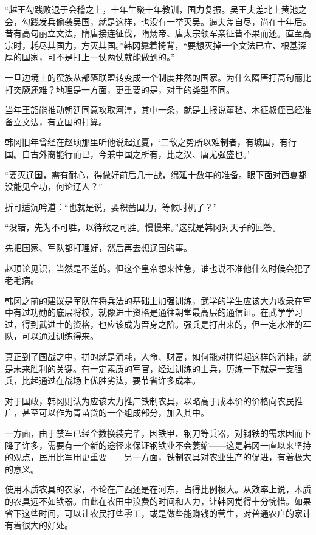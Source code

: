 “越王勾践败退于会稽之上，十年生聚十年教训，国力复振。吴王夫差北上黄池之会，勾践发兵偷袭吴国，就是这样，也没有一举灭吴。逼夫差自尽，尚在十年后。昔有高句丽立文法，隋唐接连征伐，隋炀帝、唐太宗领军亲征皆不果而还。直至高宗时，耗尽其国力，方灭其国。”韩冈靠着椅背，“要想灭掉一个文法已立、根基深厚的国家，可不是打上一仗两仗就能做到的。”

一旦边境上的蛮族从部落联盟转变成一个制度井然的国家。为什么隋唐打高句丽比打突厥还难？地理是一方面，更重要的是，对手的类型不同。

当年王韶能推动朝廷同意攻取河湟，其中一条，就是上报说董毡、木征叔侄已经准备立文法，有立国的打算。

韩冈旧年曾经在赵顼那里听他说起辽夏，‘二敌之势所以难制者，有城国，有行国。自古外裔能行而已，今兼中国之所有，比之汉、唐尤强盛也。’

“要灭辽国，需有耐心，得做好前后几十战，绵延十数年的准备。眼下面对西夏都没能见全功，何论辽人？”

折可适沉吟道：“也就是说，要积蓄国力，等候时机了？”

“没错，先为不可胜，以待敌之可胜。慢慢来。”这就是韩冈对天子的回答。

先把国家、军队都打理好，然后再去想辽国的事。

赵顼论见识，当然是不差的。但这个皇帝想来性急，谁也说不准他什么时候会犯了老毛病。

韩冈之前的建议是军队在将兵法的基础上加强训练，武学的学生应该大力收录在军中有过功勋的底层将校，就像进士资格是通往朝堂最高层的通信证。在武学学习过，得到武进士的资格，也应该成为晋身之阶。强兵是打出来的，但一定水准的军队，可以通过训练得来。

真正到了国战之中，拼的就是消耗，人命、财富，如何能对拼得起这样的消耗，就是未来胜利的关键。有一定素质的军官，经过训练的士兵，历练一下就是一支强兵，比起通过在战场上优胜劣汰，要节省许多成本。

对于国政，韩冈则认为应该大力推广铁制农具，以略高于成本价的价格向农民推广，甚至可以作为青苗贷的一个组成部分，加入其中。

一方面，由于禁军已经全数换装完毕，因铁甲、钢刀等兵器，对钢铁的需求因而下降了许多，需要有一个新的途径来保证钢铁业不会萎缩——这是韩冈一直以来坚持的观点，民用比军用更重要——另一方面，铁制农具对农业生产的促进，有着极大的意义。

使用木质农具的农家，不论在广西还是在河东，占得比例极大。从效率上说，木质的农具远不如铁器。由此在农田中浪费的时间和人力，让韩冈觉得十分惋惜。如果省下这些时间，可以让农民打些零工，或是做些能赚钱的营生，对普通农户的家计有着很大的好处。

